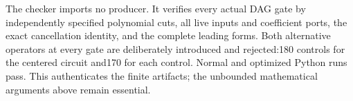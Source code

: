 The checker imports no producer.  It verifies every actual DAG gate by
independently specified polynomial cuts, all live inputs and coefficient
ports, the exact cancellation identity, and the complete leading forms.
Both alternative operators at every gate are deliberately introduced and
rejected:180 controls for the centered circuit and170 for each control.
Normal and optimized Python runs pass.  This authenticates the finite
artifacts; the unbounded mathematical arguments above remain essential.
